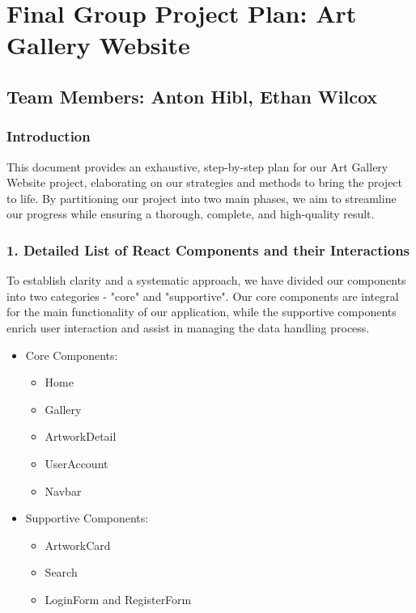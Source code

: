 \documentclass[11pt]{article}
\author{Anton Hibl}
\date{\today}
\title{}
\begin{document}
\tableofcontents

\section{Final Group Project Plan: Art Gallery Website}
\label{sec:orgff780d7}

\subsection{Team Members: Anton Hibl, Ethan Wilcox}
\label{sec:org24faf47}

\subsubsection{Introduction}
\label{sec:org38be2af}

This document provides an exhaustive, step-by-step plan for our Art Gallery
Website project, elaborating on our strategies and methods to bring the project
to life. By partitioning our project into two main phases, we aim to streamline
our progress while ensuring a thorough, complete, and high-quality result. 

\subsubsection{1. Detailed List of React Components and their Interactions}
\label{sec:org0e30339}

To establish clarity and a systematic approach, we have divided our components
into two categories - "core" and "supportive". Our core components are integral
for the main functionality of our application, while the supportive components
enrich user interaction and assist in managing the data handling process. 

\begin{itemize}
\item Core Components:

\begin{itemize}
\item Home
\item Gallery
\item ArtworkDetail
\item UserAccount
\item Navbar
\end{itemize}

\item Supportive Components:

\begin{itemize}
\item ArtworkCard
\item Search
\item LoginForm and RegisterForm
\end{itemize}
\end{itemize}
\end{document}
